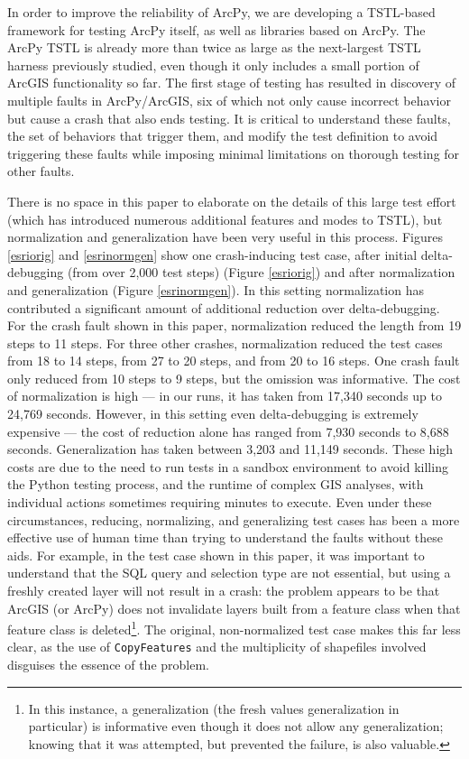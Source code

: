 In order to improve the reliability of ArcPy, we are developing a
TSTL-based framework for testing ArcPy itself, as well as libraries
based on ArcPy.  The ArcPy TSTL is already more than twice as large as
the next-largest TSTL harness previously studied, even though it only
includes a small portion of ArcGIS functionality so far. The first
stage of testing has resulted in discovery of multiple faults in
ArcPy/ArcGIS, six of which not only cause incorrect behavior but cause
a crash that also ends testing.  It is critical to understand these
faults, the set of behaviors that trigger them, and modify the test
definition to avoid triggering these faults while imposing minimal limitations
on thorough testing for other faults.

There is no space in this paper to elaborate on the details of this
large test effort (which has introduced numerous additional features
and modes to TSTL), but normalization and generalization have been
very useful in this process.  Figures \ref{esriorig} and
\ref{esrinormgen} show one crash-inducing test case, after initial
delta-debugging (from over 2,000 test steps) (Figure \ref{esriorig})
and after normalization and generalization (Figure \ref{esrinormgen}).
In this setting normalization has contributed a significant amount of
additional reduction over delta-debugging.  For the crash fault shown
in this paper, normalization reduced the length from 19 steps to 11
steps.  For three other crashes, normalization reduced the test cases
from 18 to 14 steps, from 27 to 20 steps, and from 20 to 16 steps. One crash fault only reduced from 10 steps to 9 steps, but the
omission was informative.  The cost of normalization is high --- in
our runs, it has taken from 17,340 seconds up to 24,769 seconds.
However, in this setting even delta-debugging is extremely expensive
--- the cost of reduction alone has ranged from 7,930 seconds to 8,688
seconds.  Generalization has taken between 3,203 and
 11,149 seconds.  These high costs are due to the need to run
tests in a sandbox environment to avoid killing the Python testing
process, and the runtime of complex GIS analyses, with individual
actions sometimes requiring minutes to execute.
Even under these circumstances, reducing, normalizing, and
generalizing test cases has been a more effective use of human time than
trying to understand the faults without these aids.  For example, in
the test case shown in this paper, it was important to understand that
the SQL query and selection type are not essential, but using a
freshly created layer will not result in a crash: the problem appears
to be that ArcGIS (or ArcPy) does not invalidate layers built from a
feature class when that feature class is deleted\footnote{In this
  instance, a generalization (the fresh values generalization in
  particular) is informative even though it does not allow any
  generalization; knowing that it was attempted, but prevented the
  failure, is also valuable.}.  The original, non-normalized test case
makes this far less clear, as the use of {\tt CopyFeatures} and the
multiplicity of shapefiles involved disguises the essence of the
problem.

